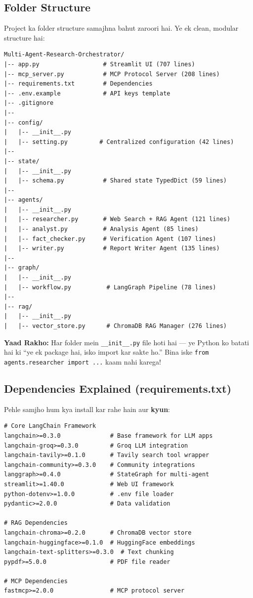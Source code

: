 \documentclass[12pt, a4paper]{article}
\begin{document}
\subsection{Folder Structure}

Project ka folder structure samajhna bahut zaroori hai. Ye ek clean, modular structure hai:

\begin{lstlisting}[style=bashstyle]
Multi-Agent-Research-Orchestrator/
|-- app.py                  # Streamlit UI (707 lines)
|-- mcp_server.py           # MCP Protocol Server (208 lines)
|-- requirements.txt        # Dependencies
|-- .env.example            # API keys template
|-- .gitignore
|--
|-- config/
|   |-- __init__.py
|   |-- setting.py         # Centralized configuration (42 lines)
|--
|-- state/
|   |-- __init__.py
|   |-- schema.py           # Shared state TypedDict (59 lines)
|--
|-- agents/
|   |-- __init__.py
|   |-- researcher.py       # Web Search + RAG Agent (121 lines)
|   |-- analyst.py          # Analysis Agent (85 lines)
|   |-- fact_checker.py     # Verification Agent (107 lines)
|   |-- writer.py           # Report Writer Agent (135 lines)
|--
|-- graph/
|   |-- __init__.py
|   |-- workflow.py          # LangGraph Pipeline (78 lines)
|--
|-- rag/
|   |-- __init__.py
|   |-- vector_store.py      # ChromaDB RAG Manager (276 lines)
\end{lstlisting}

\begin{notebox}
\textbf{Yaad Rakho:} Har folder mein \texttt{\_\_init\_\_.py} file hoti hai --- ye Python ko batati hai ki ``ye ek package hai, isko import kar sakte ho.'' Bina iske \texttt{from agents.researcher import ...} kaam nahi karega!
\end{notebox}

\subsection{Dependencies Explained (requirements.txt)}

Pehle samjho hum kya install kar rahe hain aur \textbf{kyun}:

\begin{lstlisting}[style=pythonstyle, title={\color{accentgreen}\faIcon{file} requirements.txt}]
# Core LangChain Framework
langchain>=0.3.0              # Base framework for LLM apps
langchain-groq>=0.3.0         # Groq LLM integration
langchain-tavily>=0.1.0       # Tavily search tool wrapper
langchain-community>=0.3.0    # Community integrations
langgraph>=0.4.0              # StateGraph for multi-agent
streamlit>=1.40.0             # Web UI framework
python-dotenv>=1.0.0          # .env file loader
pydantic>=2.0.0               # Data validation

# RAG Dependencies
langchain-chroma>=0.2.0       # ChromaDB vector store
langchain-huggingface>=0.1.0  # HuggingFace embeddings
langchain-text-splitters>=0.3.0  # Text chunking
pypdf>=5.0.0                  # PDF file reader

# MCP Dependencies
fastmcp>=2.0.0                # MCP protocol server
\end{lstlisting}
\end{document}
